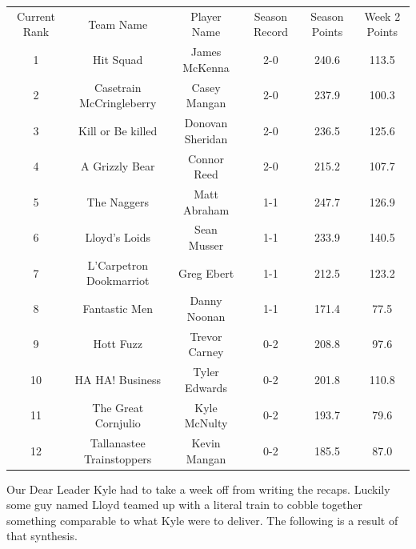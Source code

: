 \documentclass[11pt,letterpaper]{article}
\begin{document}
\newpage
{}
\vspace{-25pt}
\begin{table} [h]
\footnotesize
\begin{center}
\begin{tabular} { c c c c c c }
\\[3mm] Current Rank & Team Name & Player Name & Season Record &  Season Points & Week 2 Points
\\[3mm] 1 & Hit Squad & James McKenna & 2-0 & 240.6 & 113.5
\\ 2 & Casetrain McCringleberry & Casey Mangan & 2-0 & 237.9 & 100.3
\\ 3 & Kill or Be killed & Donovan Sheridan & 2-0 & 236.5 & 125.6
\\ 4 & A Grizzly Bear & Connor Reed & 2-0 & 215.2 & 107.7
\\ 5 & The Naggers & Matt Abraham & 1-1 & 247.7 & 126.9
\\ 6 & Lloyd's Loids & Sean Musser & 1-1 & 233.9 & 140.5
\\ 7 & L'Carpetron Dookmarriot & Greg Ebert & 1-1 & 212.5 & 123.2
\\ 8 & Fantastic Men & Danny Noonan & 1-1 & 171.4 & 77.5
\\ 9 & Hott Fuzz & Trevor Carney & 0-2 & 208.8 & 97.6
\\ 10 & HA HA! Business & Tyler Edwards & 0-2 & 201.8 & 110.8
\\ 11 & The Great Cornjulio & Kyle McNulty & 0-2 & 193.7 & 79.6
\\ 12 & Tallanastee Trainstoppers & Kevin Mangan & 0-2 & 185.5 & 87.0
\end{tabular}
\end{center}
\end{table}


\newpage
{}
Our Dear Leader Kyle had to take a week off from writing the recaps. Luckily some guy named Lloyd teamed up with a literal train to cobble together something comparable to what Kyle were to deliver. The following is a result of that synthesis.
\end{document}

